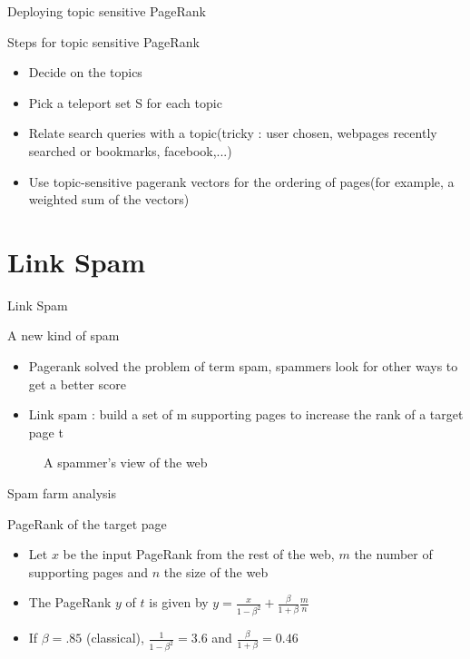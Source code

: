 \documentclass[10pt]{beamer}
\begin{document}
\begin{frame}{Deploying topic sensitive PageRank}
  \begin{block}{Steps for topic sensitive PageRank}
    \begin{itemize}
      \item Decide on the topics
      \item Pick a teleport set S for each topic
      \item Relate search queries with a topic(tricky : user chosen, webpages recently searched or bookmarks, facebook,...)
      \item Use topic-sensitive pagerank vectors for the ordering of pages(for example, a weighted sum of the vectors)
    \end{itemize}
  \end{block}
\end{frame}


\section{Link Spam}
\begin{frame}
  \tableofcontents[currentsection]
\end{frame}
\begin{frame}{Link Spam}
\begin{block}{A new kind of spam}
\begin{itemize}
\item Pagerank solved the problem of term spam, spammers look for other ways to get a better score
\item Link spam : build a set of m supporting pages to increase the rank of a target page t
\end{itemize}
\end{block}
\begin{figure}
\centering
\caption{A spammer's view of the web}
\end{figure}
\end{frame}

\begin{frame}{Spam farm analysis}
\begin{block}{PageRank of the target page}
\begin{itemize}
\item Let $x$ be the input PageRank from the rest of the web, $m$ the number of supporting pages and $n$ the size of the web
\item The PageRank $y$ of $t$ is given by
$ y = \frac{x}{1-\beta^2}+ \frac{\beta}{1+\beta} \frac{m}{n}$
\item If $\beta=.85$ (classical), $\frac{1}{1-\beta^2} = 3.6$ and $\frac{\beta}{1+\beta} = 0.46$
\end{itemize}
\end{block}
\end{frame}
\end{document}
